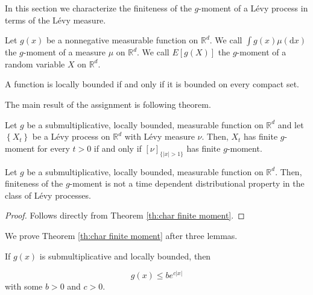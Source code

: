 \documentclass[a4paper,11pt]{article}
\begin{document}
In this section we characterize the finiteness of the $g$-moment of a Lévy process in terms of the Lévy measure.

\begin{definition}[$g$-moment]
    Let $g(x)$ be a nonnegative measurable function on $\mathbb{R}^{d}$. We call
    $\int g(x) \mu(\mathrm{d} x)$ the $g$-moment of a measure $\mu$ on $\mathbb{R}^{d}$. We call $E[g(X)]$ the $g$-moment of a random variable $X$ on $\mathbb{R}^{d}$.
\end{definition}

\begin{definition}
    A function is locally bounded if and only if it is bounded on every compact set.
\end{definition}

The main result of the assignment is following theorem.


\begin{theorem} \label{th:char finite moment}
    Let $g$ be a submultiplicative, locally bounded, measurable
    function on $\mathbb{R}^{d}$ and let $\left\{X_{t}\right\}$ be a Lévy process
    on $\mathbb{R}^{d}$ with Lévy measure $\nu$. Then, $X_{t}$ has finite $g$-moment for every $t>0$ if
    and only if $[\nu]_{\{|x|>1\}}$ has finite $g$-moment.
\end{theorem}

\begin{corollary}
    Let $g$ be a submultiplicative, locally bounded, measurable
    function on $\mathbb{R}^{d}$. Then, finiteness of the $g$-moment is not a time dependent
    distributional property in the class of Lévy processes.
\end{corollary}
\begin{proof}
    Follows directly from Theorem \ref{th:char finite moment}.
\end{proof}

We prove Theorem \ref{th:char finite moment} after three lemmas.

\begin{lemma}
    If $g(x)$ is submultiplicative and locally bounded, then

    \begin{equation}
        g(x) \leq b e^{c|x|}
    \end{equation}
    with some $b>0$ and $c>0$.
\end{lemma}
\end{document}
